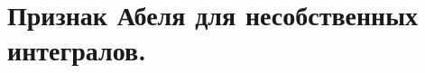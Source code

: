 \documentclass[../main.tex]{subfiles}
\begin{document}
\newpage
\section{Признак Абеля для несобственных интегралов.}
\end{document}
